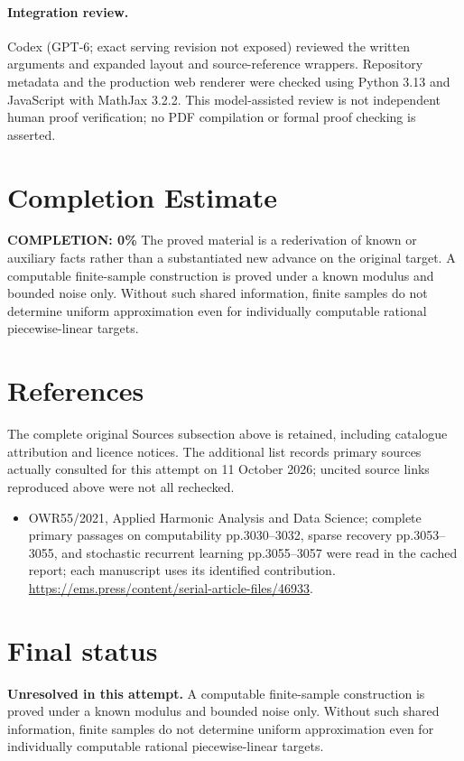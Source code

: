 \documentclass[11pt]{article}
\begin{document}
\paragraph{Integration review.} Codex (GPT-6; exact serving revision not exposed) reviewed the written arguments and expanded layout and source-reference wrappers. Repository metadata and the production web renderer were checked using Python 3.13 and JavaScript with MathJax 3.2.2. This model-assisted review is not independent human proof verification; no PDF compilation or formal proof checking is asserted.

\section{Completion Estimate}
\noindent\textbf{COMPLETION: 0\%}
The proved material is a rederivation of known or auxiliary facts rather than a substantiated new advance on the original target. A computable finite-sample construction is proved under a known modulus and bounded noise only. Without such shared information, finite samples do not determine uniform approximation even for individually computable rational piecewise-linear targets.
\section{References}
The complete original Sources subsection above is retained, including catalogue attribution and licence notices. The additional list records primary sources actually consulted for this attempt on 11 October 2026; uncited source links reproduced above were not all rechecked.
\begin{itemize}
\item OWR55/2021, Applied Harmonic Analysis and Data Science; complete primary passages on computability pp.3030–3032, sparse recovery pp.3053–3055, and stochastic recurrent learning pp.3055–3057 were read in the cached report; each manuscript uses its identified contribution. \url{https://ems.press/content/serial-article-files/46933}.
\end{itemize}
\section{Final status}
\textbf{Unresolved in this attempt.} A computable finite-sample construction is proved under a known modulus and bounded noise only. Without such shared information, finite samples do not determine uniform approximation even for individually computable rational piecewise-linear targets.
\end{document}
